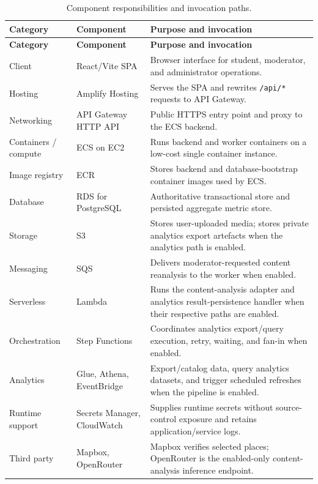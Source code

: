 \documentclass[11pt,a4paper]{article}
\begin{document}
\small
\begin{longtable}{@{}p{28mm}p{32mm}p{93mm}@{}}
\caption{Component responsibilities and invocation paths.}\label{tab:components}\\
\toprule \textbf{Category} & \textbf{Component} & \textbf{Purpose and invocation}\\ \midrule
\endfirsthead
\toprule \textbf{Category} & \textbf{Component} & \textbf{Purpose and invocation}\\ \midrule
\endhead
Client & React/Vite SPA & Browser interface for student, moderator, and administrator operations.\\
Hosting & Amplify Hosting & Serves the SPA and rewrites \texttt{/api/*} requests to API Gateway.\\
Networking & API Gateway HTTP API & Public HTTPS entry point and proxy to the ECS backend.\\
Containers / compute & ECS on EC2 & Runs backend and worker containers on a low-cost single container instance.\\
Image registry & ECR & Stores backend and database-bootstrap container images used by ECS.\\
Database & RDS for PostgreSQL & Authoritative transactional store and persisted aggregate metric store.\\
Storage & S3 & Stores user-uploaded media; stores private analytics export artefacts when the analytics path is enabled.\\
Messaging & SQS & Delivers moderator-requested content reanalysis to the worker when enabled.\\
Serverless & Lambda & Runs the content-analysis adapter and analytics result-persistence handler when their respective paths are enabled.\\
Orchestration & Step Functions & Coordinates analytics export/query execution, retry, waiting, and fan-in when enabled.\\
Analytics & Glue, Athena, EventBridge & Export/catalog data, query analytics datasets, and trigger scheduled refreshes when the pipeline is enabled.\\
Runtime support & Secrets Manager, CloudWatch & Supplies runtime secrets without source-control exposure and retains application/service logs.\\
Third party & Mapbox, OpenRouter & Mapbox verifies selected places; OpenRouter is the enabled-only content-analysis inference endpoint.\\
\bottomrule
\end{longtable}
\normalsize
\end{document}
